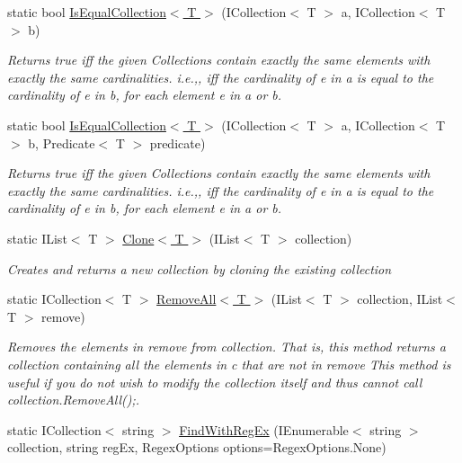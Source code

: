 \begin{DoxyCompactItemize}
static bool \hyperlink{class_ultimate_1_1_utilities_1_1_collection_utils_a7a300f6b1609e5d133b8d4e34565c98e}{Is\+Equal\+Collection$<$ T $>$} (I\+Collection$<$ T $>$ a, I\+Collection$<$ T $>$ b)
\begin{DoxyCompactList}\small\item\em Returns true iff the given Collections contain exactly the same elements with exactly the same cardinalities. i.\+e.,, iff the cardinality of e in a is equal to the cardinality of e in b, for each element e in a or b. \end{DoxyCompactList}\item 
static bool \hyperlink{class_ultimate_1_1_utilities_1_1_collection_utils_a92d7c0f526b11f97bb568cd7ab437c08}{Is\+Equal\+Collection$<$ T $>$} (I\+Collection$<$ T $>$ a, I\+Collection$<$ T $>$ b, Predicate$<$ T $>$ predicate)
\begin{DoxyCompactList}\small\item\em Returns true iff the given Collections contain exactly the same elements with exactly the same cardinalities. i.\+e.,, iff the cardinality of e in a is equal to the cardinality of e in b, for each element e in a or b. \end{DoxyCompactList}\item 
static I\+List$<$ T $>$ \hyperlink{class_ultimate_1_1_utilities_1_1_collection_utils_ae060f1e88ce265d024e4eec09c698807}{Clone$<$ T $>$} (I\+List$<$ T $>$ collection)
\begin{DoxyCompactList}\small\item\em Creates and returns a new collection by cloning the existing collection \end{DoxyCompactList}\item 
static I\+Collection$<$ T $>$ \hyperlink{class_ultimate_1_1_utilities_1_1_collection_utils_ae8ab917d8baea49f45181b12e22a8b3b}{Remove\+All$<$ T $>$} (I\+List$<$ T $>$ collection, I\+List$<$ T $>$ remove)
\begin{DoxyCompactList}\small\item\em Removes the elements in remove from collection. That is, this method returns a collection containing all the elements in c that are not in remove This method is useful if you do not wish to modify the collection itself and thus cannot call collection.\+Remove\+All();. \end{DoxyCompactList}\item 
static I\+Collection$<$ string $>$ \hyperlink{class_ultimate_1_1_utilities_1_1_collection_utils_aaabf1088fb1274c503be4e4c6780ca0d}{Find\+With\+Reg\+Ex} (I\+Enumerable$<$ string $>$ collection, string reg\+Ex, Regex\+Options options=Regex\+Options.\+None)

\end{DoxyCompactItemize}
